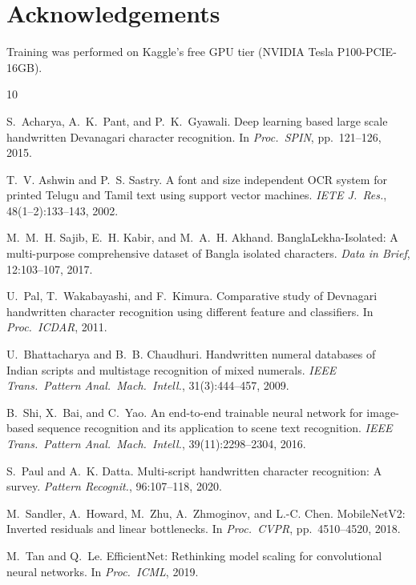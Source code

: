 \documentclass[10pt,twocolumn]{article}
\begin{document}
\section*{Acknowledgements}
Training was performed on Kaggle's free GPU tier (NVIDIA Tesla P100-PCIE-16GB).


\begin{thebibliography}{10}

S.~Acharya, A.~K.~Pant, and P.~K.~Gyawali.
\newblock Deep learning based large scale handwritten Devanagari character recognition.
\newblock In \textit{Proc.\ SPIN}, pp.~121--126, 2015.

T.~V. Ashwin and P.~S. Sastry.
\newblock A font and size independent OCR system for printed Telugu and Tamil
  text using support vector machines.
\newblock \textit{IETE J.\ Res.}, 48(1--2):133--143, 2002.

M.~M.~H. Sajib, E.~H. Kabir, and M.~A.~H. Akhand.
\newblock BanglaLekha-Isolated: A multi-purpose comprehensive dataset of
  Bangla isolated characters.
\newblock \textit{Data in Brief}, 12:103--107, 2017.

U.~Pal, T.~Wakabayashi, and F.~Kimura.
\newblock Comparative study of Devnagari handwritten character recognition
  using different feature and classifiers.
\newblock In \textit{Proc.\ ICDAR}, 2011.

U.~Bhattacharya and B.~B. Chaudhuri.
\newblock Handwritten numeral databases of Indian scripts and multistage
  recognition of mixed numerals.
\newblock \textit{IEEE Trans.\ Pattern Anal.\ Mach.\ Intell.},
  31(3):444--457, 2009.

B.~Shi, X.~Bai, and C.~Yao.
\newblock An end-to-end trainable neural network for image-based sequence
  recognition and its application to scene text recognition.
\newblock \textit{IEEE Trans.\ Pattern Anal.\ Mach.\ Intell.},
  39(11):2298--2304, 2016.

S.~Paul and A.~K. Datta.
\newblock Multi-script handwritten character recognition: A survey.
\newblock \textit{Pattern Recognit.}, 96:107--118, 2020.

M.~Sandler, A.~Howard, M.~Zhu, A.~Zhmoginov, and L.-C. Chen.
\newblock MobileNetV2: Inverted residuals and linear bottlenecks.
\newblock In \textit{Proc.\ CVPR}, pp.~4510--4520, 2018.

M.~Tan and Q.~Le.
\newblock EfficientNet: Rethinking model scaling for convolutional neural networks.
\newblock In \textit{Proc.\ ICML}, 2019.

\end{thebibliography}
\end{document}
